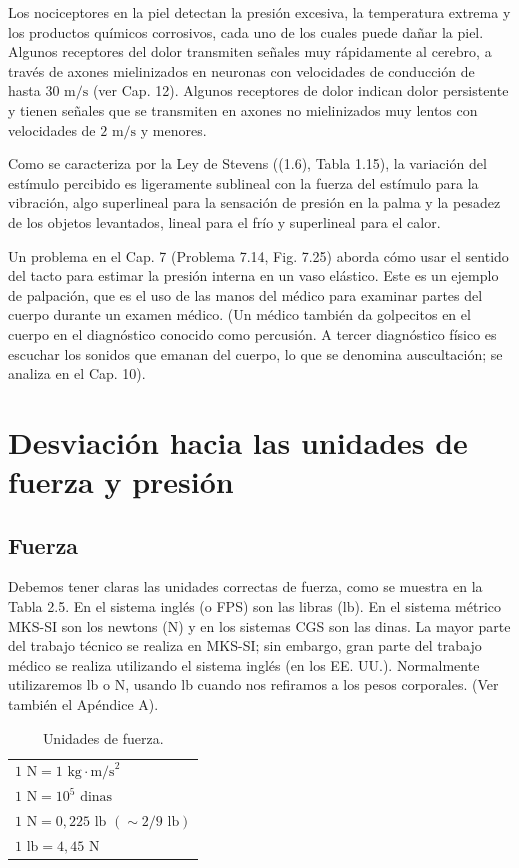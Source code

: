 \documentclass[12pt]{book}
\begin{document}
Los nociceptores en la piel detectan la presión excesiva, la temperatura extrema y los productos químicos corrosivos, cada uno de los cuales puede dañar la piel. Algunos receptores del dolor transmiten señales muy rápidamente al cerebro, a través de axones mielinizados en neuronas con velocidades de conducción de hasta $30\text{ m/s}$ (ver Cap. 12). Algunos receptores de dolor indican dolor persistente y tienen señales que se transmiten en axones no mielinizados muy lentos con velocidades de $2\text{ m/s}$ y menores.

Como se caracteriza por la Ley de Stevens ((1.6), Tabla 1.15), la variación del estímulo percibido es ligeramente sublineal con la fuerza del estímulo para la vibración, algo superlineal para la sensación de presión en la palma y la pesadez de los objetos levantados, lineal para el frío y superlineal para el calor.

Un problema en el Cap. 7 (Problema 7.14, Fig. 7.25) aborda cómo usar el sentido del tacto para estimar la presión interna en un vaso elástico. Este es un ejemplo de palpación, que es el uso de las manos del médico para examinar partes del cuerpo durante un examen médico. (Un médico también da golpecitos en el cuerpo en el diagnóstico conocido como percusión. A tercer diagnóstico físico es escuchar los sonidos que emanan del cuerpo, lo que se denomina auscultación; se analiza en el Cap. 10).

\section{Desviación hacia las unidades de fuerza y presión}

\subsection{Fuerza}

Debemos tener claras las unidades correctas de fuerza, como se muestra en la Tabla 2.5. En el sistema inglés (o FPS) son las libras (lb). En el sistema métrico MKS-SI son los newtons (N) y en los sistemas CGS son las dinas. La mayor parte del trabajo técnico se realiza en MKS-SI; sin embargo, gran parte del trabajo médico se realiza utilizando el sistema inglés (en los EE. UU.). Normalmente utilizaremos lb o N, usando lb cuando nos refiramos a los pesos corporales. (Ver también el Apéndice A).

\begin{table}[htbp]
\centering
\caption{Unidades de fuerza.}
\label{tab:25}
\begin{tabular}{l}
\toprule
$1\text{ N} = 1\text{ kg}\cdot\text{m/s}^2$ \\
$1\text{ N} = 10^5\text{ dinas}$ \\
$1\text{ N} = 0,225\text{ lb } (\sim 2/9\text{ lb})$ \\
$1\text{ lb} = 4,45\text{ N}$ \\
\bottomrule
\end{tabular}
\end{table}
\end{document}
